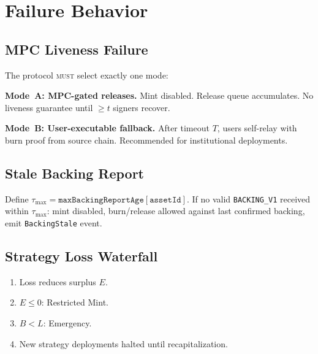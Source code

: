 \section{Failure Behavior}

\label{sec:failures}

\subsection{MPC Liveness Failure}
\label{sec:mpc-halt}

\begin{requirement}
The protocol \textsc{must} select exactly one mode:

\noindent\textbf{Mode~A: MPC-gated releases.} Mint disabled. Release queue accumulates. No liveness guarantee until $\geq t$ signers recover.

\noindent\textbf{Mode~B: User-executable fallback.} After timeout $T$, users self-relay with burn proof from source chain. Recommended for institutional deployments.
\end{requirement}

\subsection{Stale Backing Report}
\label{sec:stale}

\begin{requirement}
Define $\tau_{\max} = \texttt{maxBackingReportAge}[\texttt{assetId}]$. If no valid \texttt{BACKING\_V1} received within $\tau_{\max}$: mint disabled, burn/release allowed against last confirmed backing, emit \texttt{BackingStale} event.
\end{requirement}

\subsection{Strategy Loss Waterfall}

\begin{requirement}
\begin{enumerate}[nosep]
  \item Loss reduces surplus $E$.
  \item $E \leq 0$: Restricted Mint.
  \item $B < L$: Emergency.
  \item New strategy deployments halted until recapitalization.
\end{enumerate}
\end{requirement}

